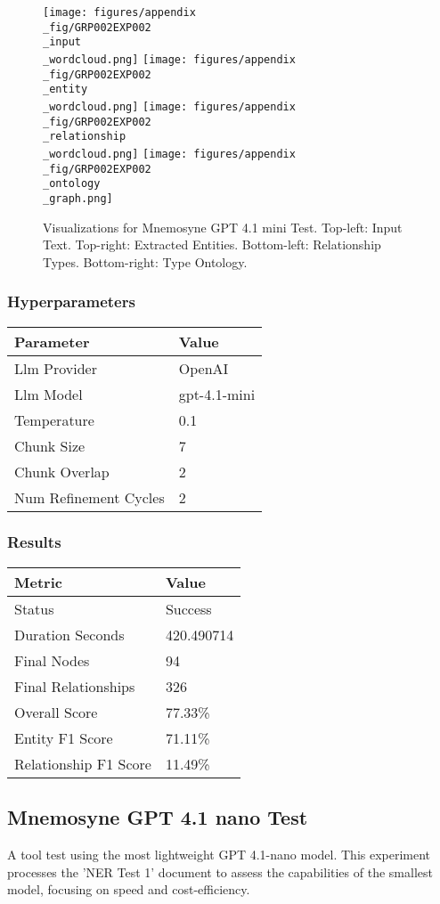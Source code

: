 \begin{figure}[!ht]
  \centering
  \texttt{[image: figures/appendix\\\_fig/GRP002EXP002\\\_input\\\_wordcloud.png]}
  \texttt{[image: figures/appendix\\\_fig/GRP002EXP002\\\_entity\\\_wordcloud.png]}
  \texttt{[image: figures/appendix\\\_fig/GRP002EXP002\\\_relationship\\\_wordcloud.png]}
  \texttt{[image: figures/appendix\\\_fig/GRP002EXP002\\\_ontology\\\_graph.png]}
  \caption{Visualizations for Mnemosyne GPT 4.1 mini Test. Top-left: Input Text. Top-right: Extracted Entities. Bottom-left: Relationship Types. Bottom-right: Type Ontology.}
\end{figure}
\clearpage
\subsubsection{Hyperparameters}
\begin{tabular}{ll}
\toprule
\textbf{Parameter} & \textbf{Value} \\
\midrule
Llm Provider & OpenAI \\
Llm Model & gpt-4.1-mini \\
Temperature & 0.1 \\
Chunk Size & 7 \\
Chunk Overlap & 2 \\
Num Refinement Cycles & 2 \\
\bottomrule
\end{tabular}

\subsubsection{Results}
\begin{tabular}{ll}
\toprule
\textbf{Metric} & \textbf{Value} \\
\midrule
Status & Success \\
Duration Seconds & 420.490714 \\
Final Nodes & 94 \\
Final Relationships & 326 \\
Overall Score & 77.33\% \\
Entity F1 Score & 71.11\% \\
Relationship F1 Score & 11.49\% \\
\bottomrule
\end{tabular}
\subsection{Mnemosyne GPT 4.1 nano Test}
A tool test using the most lightweight GPT 4.1-nano model. This experiment processes the 'NER Test 1' document to assess the capabilities of the smallest model, focusing on speed and cost-efficiency.

